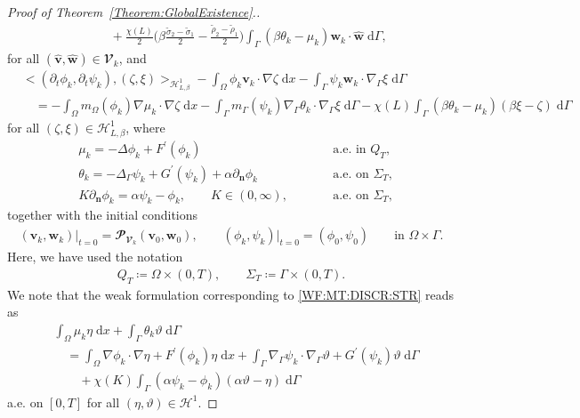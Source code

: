 \documentclass[10pt,reqno]{amsart}
\theoremstyle{remark}
\numberwithin{equation}{section}
\newcommand{\bigang}[2]{ \big< #1 , #2  \big>}
\newcommand{\n}{\mathbf{n}}
\newcommand{\bv}{\mathbf{v}}
\newcommand{\bw}{\mathbf{w}}
\newcommand{\ww}{\widehat{\bw}}
\newcommand{\wv}{\widehat{\bv}}
\newcommand{\intO}{\int_\Omega}
\newcommand{\intG}{\int_\Gamma}
\newcommand{\dx}{\;\mathrm{d}x}
\newcommand{\dG}{\;\mathrm d\Ga}
\newcommand{\delt}{\partial_{t}}
\newcommand{\deln}{\partial_\n}
\newcommand{\Grad}{\nabla}
\newcommand{\Lap}{\Delta}
\newcommand{\Gradg}{\nabla_\Ga}
\newcommand{\Lapg}{\Delta_\Ga}
\newcommand{\Om}{\Omega}
\newcommand{\Ga}{\Gamma}
\begin{document}
\begin{proof}[Proof of Theorem~\ref{Theorem:GlobalExistence}.]
\begin{align}
        &\qquad + \frac{\chi(L)}{2}\Big(\beta\frac{\tilde\sigma_2 - \tilde\sigma_1}{2} - \frac{\tilde\rho_2 - \tilde\rho_1}{2}\Big)\intG (\beta\theta_k - \mu_k)\bw_k\cdot\ww\dG, \nonumber
    \end{align}
    for all $(\wv,\ww)\in\mathbfcal{V}_k$, and
    \begin{align}\label{WF:PP:DISCR}
    	&\bigang{(\delt\phi_k,\delt\psi_k)}{(\zeta,\xi)}_{\mathcal{H}^1_{L,\beta}} - \intO \phi_k\bv_k\cdot\Grad\zeta\dx - \intG 									\psi_k\bw_k\cdot\Gradg\xi\dG \\
    	&\quad = - \intO m_\Om(\phi_k)\Grad\mu_k\cdot\Grad\zeta\dx - \intG m_\Ga(\psi_k)\Gradg\theta_k\cdot\Gradg\xi \dG - \chi(L)\intG (\beta\theta_k - \mu_k)				(\beta\xi - \zeta)\dG \nonumber
    \end{align}
    for all $(\zeta,\xi)\in\mathcal{H}^1_{L,\beta}$, where
    \begin{subequations}\label{WF:MT:DISCR:STR}
    	\begin{alignat}{2}
    		&\mu_k = -\Lap\phi_k + F^\prime(\phi_k) &&\qquad\text{a.e. in~}Q_T, \label{WF:MT:DEF:MU}\\
    		&\theta_k = -\Lapg\psi_k + G^\prime(\psi_k) + \alpha\deln\phi_k &&\qquad\text{a.e. on~}\Sigma_T, \label{WF:MT:DEF:THETA}\\
    		&K\deln\phi_k = \alpha\psi_k - \phi_k, \qquad K\in(0,\infty), &&\qquad\text{a.e. on~}\Sigma_T,
    	\end{alignat}
    \end{subequations}
together with the initial conditions
\begin{align}\label{Approx:Problem:IC}
    (\bv_k,\bw_k)\vert_{t=0} = \mathbfcal{P}_{\mathbfcal{V}_k}(\bv_0,\bw_0), \qquad (\phi_k,\psi_k)\vert_{t=0} = (\phi_0, \psi_0)  \qquad \text{in~}\Om\times\Ga. 
\end{align}
Here, we have used the notation
\begin{align*}
    Q_T \coloneqq \Om \times(0,T), \qquad \Sigma_T \coloneqq \Ga\times(0,T).
\end{align*}
We note that the weak formulation corresponding to \eqref{WF:MT:DISCR:STR} reads as
    \begin{align}
    	&\intO\mu_k\eta\dx + \intG \theta_k\vartheta\dG \nonumber \\
    	&\quad = \intO \Grad\phi_k\cdot\Grad\eta + F^\prime(\phi_k)\eta\dx + \intG \Gradg\psi_k\cdot\Gradg\vartheta + G^\prime(\psi_k)\vartheta\dG \label{WF:MT:DISCR} \\
    	&\qquad + \chi(K) \intG (\alpha\psi_k - \phi_k)(\alpha\vartheta - \eta)\dG \nonumber
    \end{align}
a.e. on $[0,T]$ for all $(\eta,\vartheta)\in\mathcal{H}^1$.


\end{proof}
\end{document}
